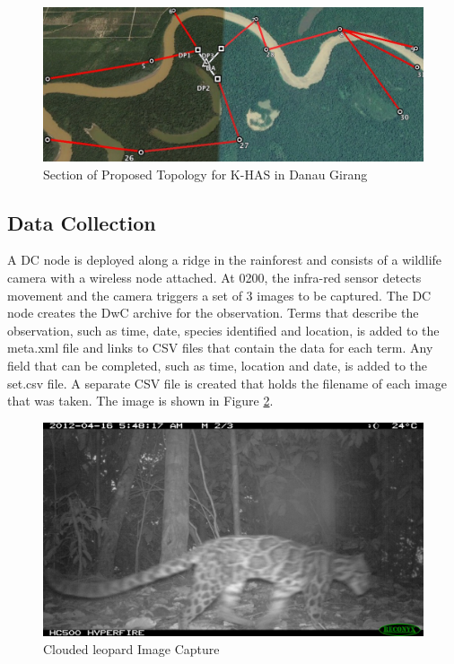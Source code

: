			\begin{figure}[!t]
			\centering
			\includegraphics[width=\textwidth]{Chap4/figures/topology}
			\caption{Section of Proposed Topology for K-HAS in Danau Girang}
			\label{topol}
			\end{figure}
			
		\subsection{Data Collection}
			A DC node is deployed along a ridge in the rainforest and consists of a wildlife camera with a wireless node attached. At 0200, the infra-red sensor detects movement and the camera triggers a set of 3 images to be captured. The DC node creates the DwC archive for the observation. Terms that describe the observation, such as time, date, species identified and location, is added to the meta.xml file and links to CSV files that contain the data for each term. Any field that can be completed, such as time, location and date, is added to the set.csv file. A separate CSV file is created that holds the filename of each image that was taken. The image is shown in Figure \ref{cl2}.
			
			\begin{figure}[!t]
			\centering
			\includegraphics[width=\textwidth]{Chap4/figures/leopard2.JPG}
			\caption{Clouded leopard Image Capture}
			\label{cl2}
			\end{figure}

